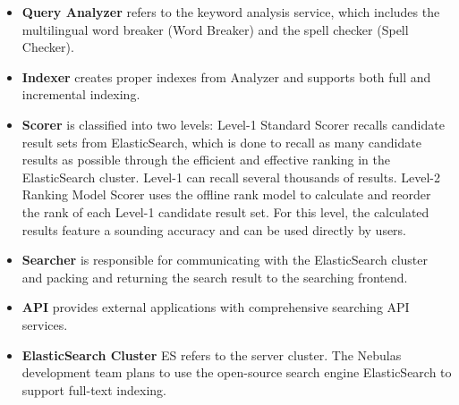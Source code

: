 \begin{itemize}
	\item \textbf{Query Analyzer} refers to the keyword analysis service, which includes the multilingual word breaker (Word Breaker) and the spell checker (Spell Checker).
	\item \textbf{Indexer} creates proper indexes from Analyzer and supports both full and incremental indexing.
	\item \textbf{Scorer} is classified into two levels: Level-1 Standard Scorer recalls candidate result sets from ElasticSearch, which is done to recall as many candidate results as possible through the efficient and effective ranking in the ElasticSearch cluster. Level-1 can recall several thousands of results. Level-2 Ranking Model Scorer uses the offline rank model to calculate and reorder the rank of each Level-1 candidate result set. For this level, the calculated results feature a sounding accuracy and can be used directly by users.
	\item \textbf{Searcher} is responsible for communicating with the ElasticSearch cluster and packing and returning the search result to the searching frontend.
	\item \textbf{API} provides external applications with comprehensive searching API services.
	\item \textbf{ElasticSearch Cluster} ES refers to the server cluster. The Nebulas development team plans to use the open-source search engine ElasticSearch to support full-text indexing.
\end{itemize}

